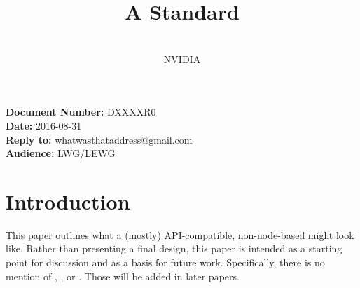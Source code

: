 \documentclass{article}
\begin{document}
\noindent\textbf{Document Number:} DXXXXR0\\
\textbf{Date:} 2016-08-31\\
\textbf{Reply to:} whatwasthataddress@gmail.com\\
\textbf{Audience:} LWG/LEWG

\title{\textbf{\Large A Standard }}
\author{
  \\NVIDIA\\
}
\date{}
{\let\newpage\relax\maketitle}


\section{Introduction}
\label{sec:intro}

This paper outlines what a (mostly) API-compatible, non-node-based 
might look like.  Rather than presenting a final design, this paper is
intended as a starting point for discussion and as a basis for future work.
Specifically, there is no mention of , , or
.  Those will be added in later papers.




\end{document}
